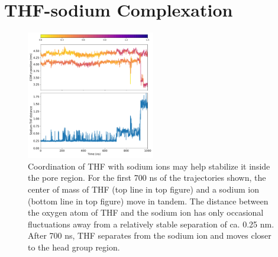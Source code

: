 \documentclass{article}
\begin{document}
  \section{THF-sodium Complexation}
  
  \begin{figure}
  \centering
  \includegraphics[width=0.5\textwidth]{thf_sodium_coordination.pdf}
  \caption{Coordination of THF with sodium ions may help stabilize it inside the
  pore region. For the first 700 ns of the trajectories shown, the center of mass
  of THF (top line in top figure) and a sodium ion (bottom line in top figure) move
  in tandem. The distance between the oxygen atom of THF and the sodium ion has only
  occasional fluctuations away from a relatively stable separation of ca. 0.25 nm. 
  After 700 ns, THF separates from the sodium ion and moves closer to the head group
  region.}\label{fig:thf_sodium_coordination}
  \end{figure}
  
\end{document}
